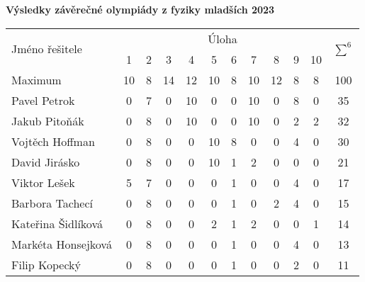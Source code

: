 \documentclass[12pt,a4paper,landscape]{article}
\begin{document}
\begin{center}
\textbf{\Large Výsledky závěrečné olympiády z fyziky mladších 2023}
\vspace{1em}

{\large
\noindent\begin{tabular}{|l||c|c|c|c|c|c|c|c|c|c||c|}
\hline
\multirow{2}{*}{Jméno řešitele} & \multicolumn{10}{|c||}{Úloha} & \multirow{2}{*}{$\sum^6$} \\
\cline{2-11}
 & 1 & 2 & 3 & 4 & 5 & 6 & 7 & 8 & 9 & 10 & \\
\hline
Maximum & 10 & 8 & 14 & 12 & 10 & 8 & 10 & 12 & 8 & 8 & 100 \\
\hline\hline
Pavel Petrok		&	0	&	7	&	0	&	10	&	0	&	0	&	10	&	0	&	8	&	0	&	35	\\
Jakub Pitoňák		&	0	&	8	&	0	&	10	&	0	&	0	&	10	&	0	&	2	&	2	&	32	\\
Vojtěch Hoffman		&	0	&	8	&	0	&	0	&	10	&	8	&	0	&	0	&	4	&	0	&	30	\\
David Jirásko		&	0	&	8	&	0	&	0	&	10	&	1	&	2	&	0	&	0	&	0	&	21	\\
Viktor Lešek		&	5	&	7	&	0	&	0	&	0	&	1	&	0	&	0	&	4	&	0	&	17	\\
Barbora Tachecí		&	0	&	8	&	0	&	0	&	0	&	1	&	0	&	2	&	4	&	0	&	15	\\
Kateřina Šidlíková	&	0	&	8	&	0	&	0	&	2	&	1	&	2	&	0	&	0	&	1	&	14	\\
Markéta Honsejková	&	0	&	8	&	0	&	0	&	0	&	1	&	0	&	0	&	4	&	0	&	13	\\
Filip Kopecký		&	0	&	8	&	0	&	0	&	0	&	1	&	0	&	0	&	2	&	0	&	11	\\
\hline
\end{tabular}
}
\end{center}
\end{document}
